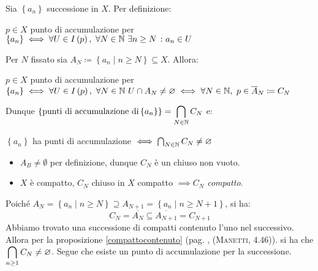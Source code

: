 \begin{demonstration}
Sia	$\left\{a_n\right\}$ successione in $X$. Per definizione:
\begin{center}
$p\in X$ punto di accumulazione per $\left\{a_n\right\}\iff \forall U\in I\left(p\right),\ \forall N\in\mathbb{N}\ \exists n\geq N\ \colon a_n\in U$
\end{center}
Per $N$ fissato sia $A_N\coloneqq \left\{a_n\mid n\geq N\right\}\subseteq X$. Allora:
\begin{center}
	$p\in X$ punto di accumulazione per $\displaystyle\left\{a_n\right\}\iff \forall U\in I\left(p\right),\ \forall N\in\mathbb{N}\ U\cap A_N\neq\varnothing\iff \forall N\in\mathbb{N},\ p\in\overline{A}_N\coloneqq C_N$
\end{center}
Dunque $\displaystyle\left\{\text{punti di accumulazione di} \left\{a_n\right\}\right\}=\mathop{{\bigcap}}\displaylimits_{N\in\mathbb{N}}C_N$ e:
 \begin{center}
 	$\left\{a_n\right\}$ ha punti di accumulazione $\iff \mathop{{\bigcap}}\displaylimits_{N\in\mathbb{N}}C_N\neq\varnothing$
 \end{center}
\begin{itemize}
	\item $A_B\neq \emptyset$ per definizione, dunque $C_N$ è un chiuso non vuoto.
	\item $X$ è compatto, $C_N$ chiuso in $X$ compatto $\implies C_N$ \textit{compatto}.
\end{itemize}
Poiché $A_N=\left\{a_n\mid n\geq N\right\}\supseteq A_ {N+1}=\left\{a_n\mid n\geq N+1\right\}$, si ha:
\begin{equation*}
C_N=\overline{A_N}\subseteq \overline{A_{N+1}}=C_{N+1}
\end{equation*}
Abbiamo trovato una successione di compatti contenuto l'uno nel successivo. Allora per la proposizione \ref{compattocontenuto} (pag. \pageref{compattocontenuto}, \textsc{(Manetti, 4.46)}). si ha che $\displaystyle\mathop{{\bigcap}}\displaylimits_{n\geq 1}C_N\neq \varnothing$.
Segue che esiste un punto di accumulazione per la successione.
\end{demonstration}
